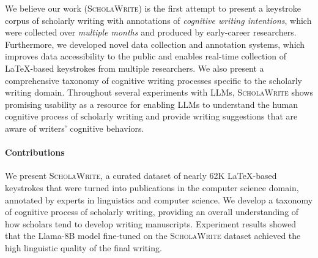 We believe our work (\textsc{ScholaWrite}) is the first attempt to present a keystroke corpus of scholarly writing with annotations of \textit{cognitive writing intentions}, which were collected over \textit{multiple months} and produced by early-career researchers. Furthermore, we developed novel data collection and annotation systems, which improves data accessibility to the public and enables real-time collection of \LaTeX-based keystrokes from multiple researchers. We also present a comprehensive taxonomy of cognitive writing processes specific to the scholarly writing domain. Throughout several experiments with LLMs, \textsc{ScholaWrite} shows promising usability as a resource for enabling LLMs to understand the human cognitive process of scholarly writing and provide writing suggestions that are aware of writers' cognitive behaviors. 

\paragraph{Contributions} 
We present \textsc{ScholaWrite}, a curated dataset of nearly 62K \LaTeX-based keystrokes that were turned into publications in the computer science domain, annotated by experts in linguistics and computer science. We develop a taxonomy of cognitive process of scholarly writing, providing an overall understanding of how scholars tend to develop writing manuscripts. Experiment results showed that the Llama-8B model fine-tuned on the \textsc{ScholaWrite} dataset achieved the high linguistic quality of the final writing. 





